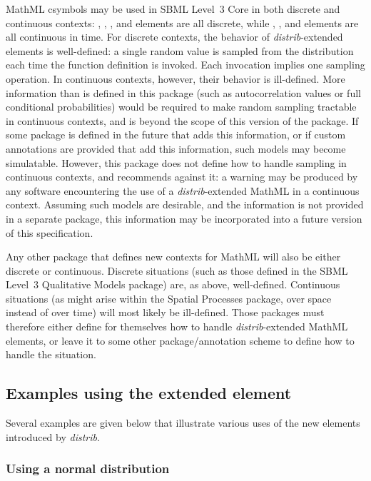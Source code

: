\documentclass[draftspec]{sbmlpkgspec}
\newcommand{\sbmlthreecore}{SBML Level~3 Core\xspace}
\newcommand{\distribshort}{\emph{distrib}\xspace}
\newcommand{\mathml}{MathML\xspace}
\begin{document}
\mathml csymbols may be used in \sbmlthreecore in both discrete and continuous contexts:  \InitialAssignment, \EventAssignment, \Priority, and \Delay elements are all discrete, while \Rule, \KineticLaw, and \Trigger elements are all continuous in time.  For discrete contexts, the behavior of \distribshort-extended \FunctionDefinition elements is well-defined:  a single random value is sampled from the distribution each time the function definition is invoked. Each invocation implies one sampling operation.  In continuous contexts, however, their behavior is ill-defined.  More information than is defined in this package (such as autocorrelation values or full conditional probabilities) would be required to make random sampling tractable in continuous contexts, and is beyond the scope of this version of the package.  If some package is defined in the future that adds this information, or if custom annotations are provided that add this information, such models may become simulatable.  However, this package does not define how to handle sampling in continuous contexts, and recommends against it: a warning may be produced by any software encountering the use of a \distribshort-extended \mathml in a continuous context.  Assuming such models are desirable, and the information is not provided in a separate package, this information may be incorporated into a future version of this specification.

Any other package that defines new contexts for MathML will also be either discrete or continuous.  Discrete situations (such as those defined in the SBML Level~3 Qualitative Models package) are, as above, well-defined.  Continuous situations (as might arise within the Spatial Processes package, over space instead of over time) will most likely be ill-defined.  Those packages must therefore either define for themselves how to handle \distribshort-extended \mathml elements, or leave it to some other package/annotation scheme to define how to handle the situation.



\subsection{Examples using the extended  element}
\label{sec:cs-examples}

Several examples are given below that illustrate various uses of the new  elements introduced by \distribshort.

\subsubsection{Using a normal distribution}
\end{document}
